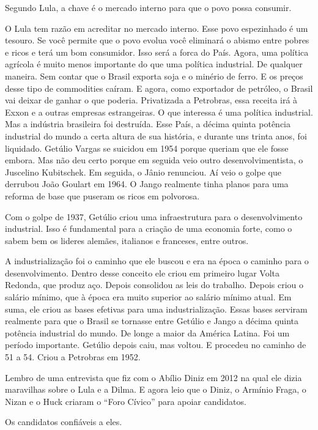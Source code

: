  Segundo Lula, a chave é o mercado interno para que o povo possa
consumir.

 O Lula tem razão em acreditar no mercado interno. Esse povo
espezinhado é um tesouro. Se você permite que o povo evolua você
eliminará o abismo entre pobres e ricos e terá um bom consumidor. Isso
será a forca do País. Agora, uma política agrícola é muito menos
importante do que uma política industrial. De qualquer maneira. Sem
contar que o Brasil exporta soja e o minério de ferro. E os preços desse
tipo de commodities caíram. E agora, como exportador de petróleo, o
Brasil vai deixar de ganhar o que poderia. Privatizada a Petrobras, essa
receita irá à Exxon e a outras empresas estrangeiras. O que interessa é
uma política industrial. Mas a indústria brasileira foi destruída. Esse
País, a décima quinta potência industrial do mundo a certa altura de sua
história, e durante uns trinta anos, foi liquidado. Getúlio Vargas se
suicidou em 1954 porque queriam que ele fosse embora. Mas não deu certo
porque em seguida veio outro desenvolvimentista, o Juscelino Kubitschek.
Em seguida, o Jânio renunciou. Aí veio o golpe que derrubou João Goulart
em 1964. O Jango realmente tinha planos para uma reforma de base que
puseram os ricos em polvorosa.

 Com o golpe de 1937, Getúlio criou uma infraestrutura para o
desenvolvimento industrial. Isso é fundamental para a criação de uma
economia forte, como o sabem bem os lideres alemães, italianos e
franceses, entre outros.

 A industrialização foi o caminho que ele buscou e era na época o
caminho para o desenvolvimento. Dentro desse conceito ele criou em
primeiro lugar Volta Redonda, que produz aço. Depois consolidou as leis
do trabalho. Depois criou o salário mínimo, que à época era muito
superior ao salário mínimo atual. Em suma, ele criou as bases efetivas
para uma industrialização. Essas bases serviram realmente para que o
Brasil se tornasse entre Getúlio e Jango a décima quinta potência
industrial do mundo. De longe a maior da América Latina. Foi um período
importante. Getúlio depois caiu, mas voltou. E procedeu no caminho de 51
a 54. Criou a Petrobras em 1952.

 Lembro de uma entrevista que fiz com o Abílio Diniz em 2012 na qual
ele dizia maravilhas sobre o Lula e a Dilma. E agora leio que o Diniz, o
Armínio Fraga, o Nizan e o Huck criaram o ``Foro Cívico'' para apoiar
candidatos.

 Os candidatos confiáveis a eles.

